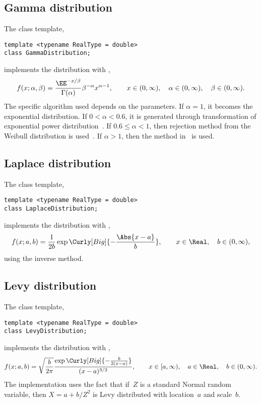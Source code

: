 \subsection{Gamma distribution}
\label{sub:Gamma distribution}

The class template,
\begin{verbatim}
template <typename RealType = double>
class GammaDistribution;
\end{verbatim}
implements the distribution with \pdf,
\begin{equation*}
  f(x;\alpha,\beta) =
  \frac{\EE^{-x/\beta}}{\Gamma(\alpha)}\beta^{-\alpha}x^{\alpha-1},\qquad
  x \in (0, \infty),\quad \alpha \in (0, \infty),\quad \beta \in (0, \infty).
\end{equation*}
The specific algorithm used depends on the parameters. If $\alpha = 1$, it
becomes the exponential distribution. If $0 < \alpha < 0.6$, it is generated
through transformation of exponential power
distribution~\cite[sec~2.6]{Devroye:1986gi}. If $0.6\le\alpha<1$, then
rejection method from the Weibull distribution is
used~\cite[sec.~3.4]{Devroye:1986gi}. If $\alpha > 1$, then the method
in~\cite{Marsaglia:2000vq} is used.

\subsection{Laplace distribution}
\label{sub:Laplace distribution}

The class template,
\begin{verbatim}
template <typename RealType = double>
class LaplaceDistribution;
\end{verbatim}
implements the distribution with \pdf,
\begin{equation*}
  f(x;a,b) = \frac{1}{2b}\exp\Curly[Big]{-\frac{\Abs{x - a}}{b}},\qquad
  x \in \Real,\quad b \in (0, \infty),
\end{equation*}
using the inverse method.

\subsection{Levy distribution}
\label{sub:Levy distribution}

The class template,
\begin{verbatim}
template <typename RealType = double>
class LevyDistribution;
\end{verbatim}
implements the distribution with \pdf,
\begin{equation*}
  f(x;a,b) =
  \sqrt{\frac{b}{2\pi}}
  \frac{\exp\Curly[Big]{-\frac{b}{2(x - a)}}}{(x - a)^{3/2}},\qquad
  x \in [a, \infty),\quad a \in \Real,\quad b \in (0, \infty).
\end{equation*}
The implementation uses the fact that if~$Z$ is a standard Normal random
variable, then $X = a + b / Z^2$ is Levy distributed with location~$a$ and
scale~$b$.

